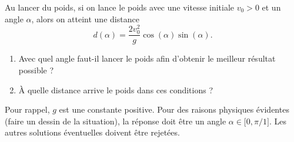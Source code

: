 
\begin{exercice}\label{exoOutilsMath-0050}

    Au lancer du poids, si on lance le poids avec une vitesse initiale $v_0>0$ et un angle $\alpha$, alors on atteint une distance
    \begin{equation}
        d(\alpha)=\frac{ 2v_0^2 }{ g }\cos(\alpha)\sin(\alpha).
    \end{equation}

    \begin{enumerate}
        \item
            Avec quel angle faut-il lancer le poids afin d'obtenir le meilleur résultat possible ?
        \item
            À quelle distance arrive le poids dans ces conditions ?
    \end{enumerate}
    Pour rappel, $g$ est une constante positive. Pour des raisons physiques évidentes (faire un dessin de la situation), la réponse doit être un angle $\alpha\in\mathopen[ 0 , \pi/1 \mathclose]$. Les autres solutions éventuelles doivent être rejetées.

\end{exercice}
